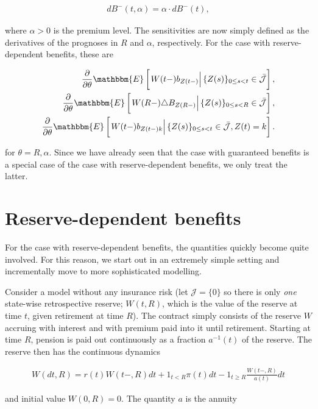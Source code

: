 \documentclass{book}
\newcommand{\1}[1]{\mathbbm{1}_{\left\lbrace #1 \right\rbrace}}
\newcommand{\econd}[2][def]{\mathbbm{E} \left[ \left. #1 \right| #2 \right]}
\theoremstyle{break}
\theoremstyle{remark}
\numberwithin{equation}{section}
\begin{document}
\begin{align*}
	dB^-(t, \alpha) = \alpha \cdot dB^-(t),
\end{align*}

where $\alpha>0$ is the premium level. The sensitivities are now simply defined as the derivatives of the prognoses in $R$ and $\alpha$, respectively. For the case with reserve-dependent benefits, these are

\begin{align*}
	\frac{\partial}{\partial \theta} \econd[W(t-)b_{Z(t-)}]{\{Z(s) \}_{0 \leq s < t} \in \bar{\mathcal{J}}}, \\
	\frac{\partial}{\partial \theta} \econd[W(R-) \triangle B_{Z(R-)}]{\{Z(s) \}_{0 \leq s < R} \in \bar{\mathcal{J}}}, \\
	\frac{\partial}{\partial \theta} \econd[W(t-)b_{Z(t-)k}]{\{Z(s) \}_{0 \leq s < t} \in \bar{\mathcal{J}}, Z(t) = k}.
\end{align*}

for  $\theta = R,\alpha$. Since we have already seen that the case with guaranteed benefits is a special case of the case with reserve-dependent benefits, we only treat the latter.

\section{Reserve-dependent benefits}

For the case with reserve-dependent benefits, the quantities quickly become quite involved. For this reason, we start out in an extremely simple setting and incrementally move to more sophisticated modelling.

Consider a model without any insurance risk (let $\mathcal{J} = \{ 0 \}$ so there is only \textit{one} state-wise retrospective reserve; $W(t,R)$, which is the value of the reserve at time $t$, given retirement at time $R$). The contract simply consists of the reserve $W$ accruing with interest and with premium paid into it until retirement. Starting at time $R$, pension is paid out continuously as a fraction $a^{-1}(t)$ of the reserve. The reserve then has the continuous dynamics

\begin{align} \label{ReserveDE}
	W(dt,R) = r(t) W(t-,R) dt + 1_{t<R} \pi(t) dt - 1_{t \geq R} \frac{W(t-,R)}{a(t)} dt
\end{align}

and initial value $W(0,R)=0$. The quantity $a$ is the annuity
\end{document}

